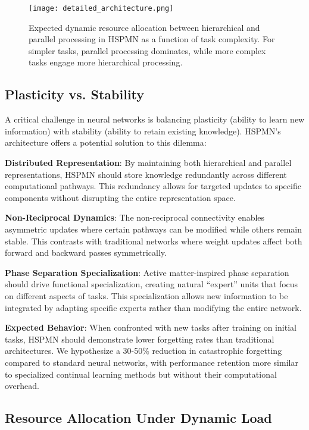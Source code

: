 \documentclass[11pt,a4paper,twocolumn]{article}
\begin{document}
\begin{figure}[t]
    \centering
    \texttt{[image: detailed\_architecture.png]}
    \caption{Expected dynamic resource allocation between hierarchical and parallel processing in HSPMN as a function of task complexity. For simpler tasks, parallel processing dominates, while more complex tasks engage more hierarchical processing.}
    \label{fig:resource-allocation}
\end{figure}

\subsection{Plasticity vs. Stability}

A critical challenge in neural networks is balancing plasticity (ability to learn new information) with stability (ability to retain existing knowledge). HSPMN's architecture offers a potential solution to this dilemma:

\textbf{Distributed Representation}: By maintaining both hierarchical and parallel representations, HSPMN should store knowledge redundantly across different computational pathways. This redundancy allows for targeted updates to specific components without disrupting the entire representation space.

\textbf{Non-Reciprocal Dynamics}: The non-reciprocal connectivity enables asymmetric updates where certain pathways can be modified while others remain stable. This contrasts with traditional networks where weight updates affect both forward and backward passes symmetrically.

\textbf{Phase Separation Specialization}: Active matter-inspired phase separation should drive functional specialization, creating natural ``expert'' units that focus on different aspects of tasks. This specialization allows new information to be integrated by adapting specific experts rather than modifying the entire network.

\textbf{Expected Behavior}: When confronted with new tasks after training on initial tasks, HSPMN should demonstrate lower forgetting rates than traditional architectures. We hypothesize a 30-50\% reduction in catastrophic forgetting compared to standard neural networks, with performance retention more similar to specialized continual learning methods but without their computational overhead.

\subsection{Resource Allocation Under Dynamic Load}
\end{document}
